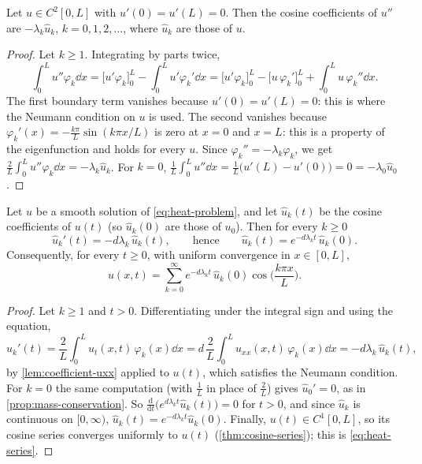 \begin{lemma}\label{lem:coefficient-uxx}
Let $u\in C^2[0,L]$ with $u'(0)=u'(L)=0$. Then the cosine coefficients of $u''$ are
$-\lambda_k\hat u_k$, $k=0,1,2,\dots$, where $\hat u_k$ are those of $u$.
\end{lemma}

\begin{proof}
Let $k\ge1$. Integrating by parts twice,
\begin{equation*}
  \int_0^L u''\varphi_k\dd x
  = \big[u'\varphi_k\big]_0^L - \int_0^L u'\varphi_k'\dd x
  = \big[u'\varphi_k\big]_0^L - \big[u\,\varphi_k'\big]_0^L + \int_0^L u\,\varphi_k''\dd x .
\end{equation*}
The first boundary term vanishes because $u'(0)=u'(L)=0$: this is where the Neumann
condition on $u$ is used. The second vanishes because
$\varphi_k'(x)=-\frac{k\pi}{L}\sin(k\pi x/L)$ is zero at $x=0$ and $x=L$: this is a
property of the eigenfunction and holds for every $u$. Since
$\varphi_k''=-\lambda_k\varphi_k$, we get
$\frac2L\int_0^Lu''\varphi_k\dd x=-\lambda_k\hat u_k$. For $k=0$,
$\frac1L\int_0^Lu''\dd x=\frac1L\big(u'(L)-u'(0)\big)=0=-\lambda_0\hat u_0$.
\end{proof}

\begin{theorem}\label{thm:heat-modes}
Let $u$ be a smooth solution of \eqref{eq:heat-problem}, and let $\hat u_k(t)$ be the
cosine coefficients of $u(t)$ (so $\hat u_k(0)$ are those of $u_0$). Then for every
$k\ge0$
\begin{equation*}
  \hat u_k'(t) = -d\lambda_k\,\hat u_k(t),\qquad\text{hence}\qquad
  \hat u_k(t) = e^{-d\lambda_kt}\,\hat u_k(0).
\end{equation*}
Consequently, for every $t\ge0$, with uniform convergence in $x\in[0,L]$,
\begin{equation}\label{eq:heat-series}
  u(x,t) = \sum_{k=0}^\infty e^{-d\lambda_kt}\,\hat u_k(0)\cos\Big(\frac{k\pi x}{L}\Big).
\end{equation}
\end{theorem}

\begin{proof}
Let $k\ge1$ and $t>0$. Differentiating under the integral sign and using the equation,
\begin{equation*}
  \hat u_k'(t) = \frac2L\int_0^L u_t(x,t)\,\varphi_k(x)\dd x
  = d\,\frac2L\int_0^L u_{xx}(x,t)\,\varphi_k(x)\dd x = -d\lambda_k\,\hat u_k(t),
\end{equation*}
by \cref{lem:coefficient-uxx} applied to $u(t)$, which satisfies the Neumann
condition. For $k=0$ the same computation (with $\frac1L$ in place of $\frac2L$)
gives $\hat u_0'=0$, as in \cref{prop:mass-conservation}. So
$\frac{\mathrm d}{\mathrm dt}\big(e^{d\lambda_kt}\hat u_k(t)\big)=0$ for $t>0$, and
since $\hat u_k$ is continuous on $[0,\infty)$, $\hat u_k(t)=e^{-d\lambda_kt}\hat u_k(0)$.
Finally, $u(t)\in C^1[0,L]$, so its cosine series converges uniformly to $u(t)$
(\cref{thm:cosine-series}); this is \eqref{eq:heat-series}.
\end{proof}


